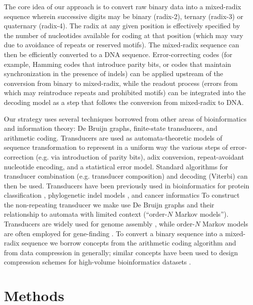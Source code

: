\documentclass[english]{article}
\begin{document}
The core idea of our approach is to convert raw binary data into a mixed-radix sequence
wherein successive digits may be binary (radix-2), ternary (radix-3) or quaternary (radix-4).
The radix at any given position is effectively specified by the number of nucleotides available for coding at that position
(which may vary due to avoidance of repeats or reserved motifs).
The mixed-radix sequence can then be efficiently converted to a DNA sequence.
Error-correcting codes (for example, Hamming codes that introduce parity bits, or codes that maintain synchronization in the presence of indels)
can be applied upstream of the conversion from binary to mixed-radix,
while the readout process (errors from which may reintroduce repeats and prohibited motifs)
can be integrated into the decoding model as a step that follows the conversion from mixed-radix to DNA.

Our strategy uses several techniques borrowed from other areas of bioinformatics and information theory:
De Bruijn graphs, finite-state transducers, and arithmetic coding.
Transducers \cite{MohriPereiraRiley2000,WikipediaTransducers} are used as automata-theoretic models of sequence transformation
to represent in a uniform way the various steps of error-correction (e.g. via introduction of parity bits),
adix conversion, repeat-avoidant nucleotide encoding, and a statistical error model.
Standard algorithms for transducer combination (e.g. transducer composition)
and decoding (Viterbi) can then be used.
Transducers have been previously used in bioinformatics for
protein classification \cite{EskinEtAl2000},
phylogenetic indel models \cite{PatenEtAl2008,WestessonEtAlArxiv2012,WestessonEtAl2012},
and cancer informatics \cite{SchwarzEtAl2014}
To construct the non-repeating transducer
we make use De Bruijn graphs
and their relationship to automata with limited context (``order-$N$ Markov models'').
Transducers are widely used for genome assembly \cite{DeBruijn1946,PevznerEtAl2001,ZerbinoBirney2008,IqbalEtAl2012},
while order-$N$ Markov models are often employed for gene-finding \cite{BurgeKarlin1997,SalzbergEtAl1999}.
To convert a binary sequence into a mixed-radix sequence we borrow concepts from the arithmetic coding algorithm \cite{Rissanen1976,Mackay2003}
and from data compression in generally; similar concepts have been used to design compression schemes for high-volume
bioinformatics datasets \cite{HsiYangEtAl2011}.

\section{Methods}
\end{document}
